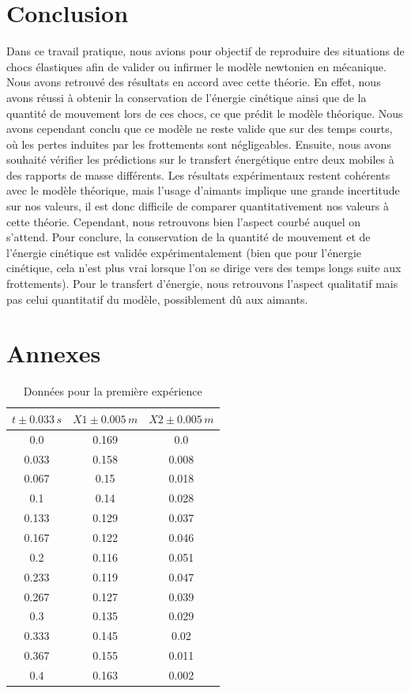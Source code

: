\documentclass[12pt]{article}
\begin{document}
\section*{Conclusion}

Dans ce travail pratique, nous avions pour objectif de reproduire des situations de chocs élastiques afin de valider ou infirmer le modèle newtonien en mécanique. Nous avons retrouvé
des résultats en accord avec cette théorie. En effet, nous avons réussi à obtenir la conservation de l'énergie cinétique ainsi que de la quantité de mouvement lors de ces chocs, ce que 
prédit le modèle théorique. Nous avons cependant conclu que ce modèle ne reste valide que sur des temps courts, où les pertes induites par les frottements sont négligeables. Ensuite,
nous avons souhaité vérifier les prédictions sur le transfert énergétique entre deux mobiles à des rapports de masse différents. Les résultats expérimentaux restent cohérents avec 
le modèle théorique, mais l'usage d'aimants implique une grande incertitude sur nos valeurs, il est donc difficile de comparer quantitativement nos valeurs à cette théorie. Cependant, 
nous retrouvons bien l'aspect courbé auquel on s'attend. Pour conclure, la conservation de la quantité de mouvement et de l'énergie cinétique est validée expérimentalement (bien que 
pour l'énergie cinétique, cela n'est plus vrai lorsque l'on se dirige vers des temps longs suite aux frottements). Pour le transfert d'énergie, nous retrouvons l'aspect qualitatif mais
pas celui quantitatif du modèle, possiblement dû aux aimants.


\newpage
\section*{Annexes}
\begin{table}[h!]
	\begin{center}
		\begin{tabular}{|c|c|c|}
		\hline
		$t\pm 0.033\, s$ & $X1\pm 0.005\, m$ & $X2\pm 0.005\, m$\\
		\hline
		0.0 & 0.169 & 0.0 \\ 
0.033 & 0.158 & 0.008 \\ 
0.067 & 0.15 & 0.018 \\ 
0.1 & 0.14 & 0.028 \\ 
0.133 & 0.129 & 0.037 \\ 
0.167 & 0.122 & 0.046 \\ 
0.2 & 0.116 & 0.051 \\ 
0.233 & 0.119 & 0.047 \\ 
0.267 & 0.127 & 0.039 \\ 
0.3 & 0.135 & 0.029 \\ 
0.333 & 0.145 & 0.02 \\ 
0.367 & 0.155 & 0.011 \\ 
0.4 & 0.163 & 0.002 \\ 	
\hline	
		\end{tabular}
		\label{Données1}
		\caption{Données pour la première expérience}
	\end{center}
\end{table}
\end{document}
